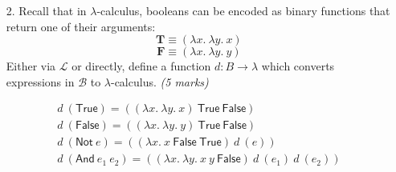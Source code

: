 \documentclass[a4paper,answers]{exam}
\begin{document}
\begin{itemize}
    \item[2.] Recall that in $\lambda$-calculus, booleans can be encoded as binary functions that return one of their arguments:
        $$ \mathbf{T} \equiv (\lambda x.\ \lambda y.\ x) $$
        $$ \mathbf{F} \equiv (\lambda x.\ \lambda y.\ y) $$
    Either via $\mathcal{L}$ or directly, define a function $d : B \rightarrow \lambda$ which converts expressions in $\mathcal{B}$ to $\lambda$-calculus. \textit{(5 marks)}
    \begin{solution}
        \begin{gather*}
            d\ (\mathsf{True}) = ((\lambda x.\ \lambda y.\ x)\ \mathsf{True}\ \mathsf{False})\\[0.3em]
            d\ (\mathsf{False}) = ((\lambda x.\ \lambda y.\ y)\ \mathsf{True}\ \mathsf{False})\\[0.3em]
            d\ (\mathsf{Not}\ e) = ((\lambda x.\ x\ \mathsf{False\ True})\ d\ (e))\\[0.3em]
            d\ (\mathsf{And}\ e_1\ e_2) = ((\lambda x.\ \lambda y.\ x\ y\ \mathsf{False})\ d\ (e_1)\ d\ (e_2))
        \end{gather*}
    \end{solution}


\end{itemize}
\end{document}
